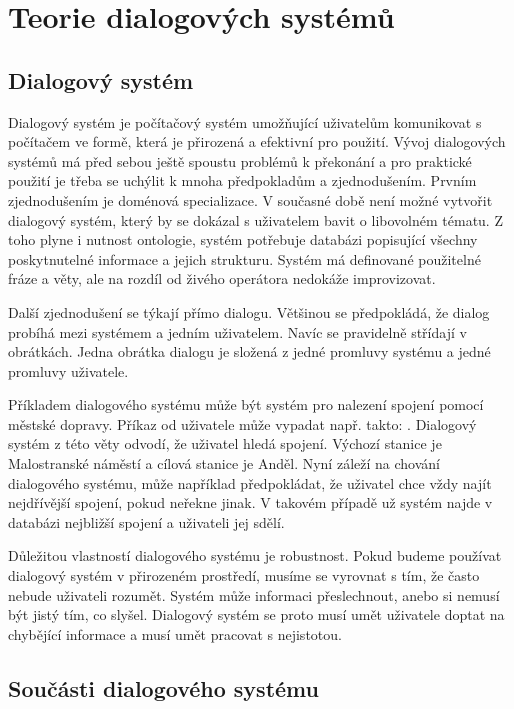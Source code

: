 \chapter{Teorie dialogových systémů}
\label{ch:kap1}

\section{Dialogový systém}

Dialogový systém je počítačový systém umožňující uživatelům komunikovat s počítačem ve formě, která je přirozená a efektivní pro použití.
Vývoj dialogových systémů má před sebou ještě spoustu problémů k překonání a pro praktické použití je třeba se uchýlit k mnoha předpokladům a zjednodušením.
Prvním zjednodušením je doménová specializace.
V současné době není možné vytvořit dialogový systém, který by se dokázal s uživatelem bavit o libovolném tématu.
Z toho plyne i nutnost ontologie, systém potřebuje databázi popisující všechny poskytnutelné informace a jejich strukturu.
Systém má definované použitelné fráze a věty, ale na rozdíl od živého operátora nedokáže improvizovat.

Další zjednodušení se týkají přímo dialogu.
Většinou se předpokládá, že dialog probíhá mezi systémem a jedním uživatelem.
Navíc se pravidelně střídají v obrátkách.
Jedna obrátka dialogu je složená z jedné promluvy systému a jedné promluvy uživatele.

Příkladem dialogového systému může být systém pro nalezení spojení pomocí městské dopravy.
Příkaz od uživatele může vypadat např. takto: .
Dialogový systém z této věty odvodí, že uživatel hledá spojení. 
Výchozí stanice je Malostranské náměstí a cílová stanice je Anděl.
Nyní záleží na chování dialogového systému, může například předpokládat, že uživatel chce vždy najít nejdřívější spojení, pokud neřekne jinak.
V takovém případě už systém najde v databázi nejbližší spojení a uživateli jej sdělí.

Důležitou vlastností dialogového systému je robustnost.
Pokud budeme používat dialogový systém v přirozeném prostředí, musíme se vyrovnat s tím, že často nebude uživateli rozumět.
Systém může informaci přeslechnout, anebo si nemusí být jistý tím, co slyšel.
Dialogový systém se proto musí umět uživatele doptat na chybějící informace a musí umět pracovat s nejistotou.

\section{Součásti dialogového systému}

